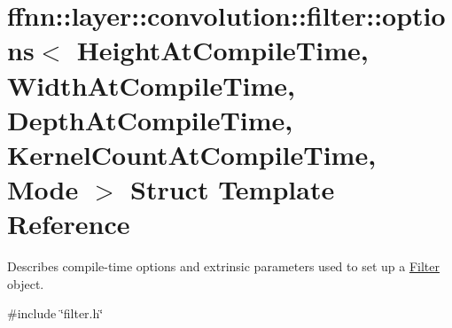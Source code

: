 \hypertarget{structffnn_1_1layer_1_1convolution_1_1filter_1_1options}{\section{ffnn\-:\-:layer\-:\-:convolution\-:\-:filter\-:\-:options$<$ Height\-At\-Compile\-Time, Width\-At\-Compile\-Time, Depth\-At\-Compile\-Time, Kernel\-Count\-At\-Compile\-Time, Mode $>$ Struct Template Reference}
\label{structffnn_1_1layer_1_1convolution_1_1filter_1_1options}
}


Describes compile-\/time options and extrinsic parameters used to set up a \hyperlink{structffnn_1_1layer_1_1convolution_1_1_filter}{Filter} object.  




{\ttfamily \#include \char`\"{}filter.\-h\char`\"{}}

